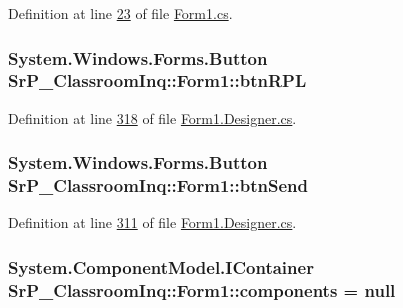 \-Definition at line \hyperlink{_form1_8cs_source_l00023}{23} of file \hyperlink{_form1_8cs_source}{\-Form1.\-cs}.

\hypertarget{class_sr_p___classroom_inq_1_1_form1_a92767c7c3fd6f7c6890a4aa3bd2efefa}{
\subsubsection[{btn\-R\-P\-L}]{\setlength{\rightskip}{0pt plus 5cm}\-System.\-Windows.\-Forms.\-Button {\bf \-Sr\-P\-\_\-\-Classroom\-Inq\-::\-Form1\-::btn\-R\-P\-L}}}
\label{class_sr_p___classroom_inq_1_1_form1_a92767c7c3fd6f7c6890a4aa3bd2efefa}


\-Definition at line \hyperlink{_form1_8_designer_8cs_source_l00318}{318} of file \hyperlink{_form1_8_designer_8cs_source}{\-Form1.\-Designer.\-cs}.

\hypertarget{class_sr_p___classroom_inq_1_1_form1_a1e5e8dfae30625b2a45b24a75a966514}{
\subsubsection[{btn\-Send}]{\setlength{\rightskip}{0pt plus 5cm}\-System.\-Windows.\-Forms.\-Button {\bf \-Sr\-P\-\_\-\-Classroom\-Inq\-::\-Form1\-::btn\-Send}}}
\label{class_sr_p___classroom_inq_1_1_form1_a1e5e8dfae30625b2a45b24a75a966514}


\-Definition at line \hyperlink{_form1_8_designer_8cs_source_l00311}{311} of file \hyperlink{_form1_8_designer_8cs_source}{\-Form1.\-Designer.\-cs}.

\hypertarget{class_sr_p___classroom_inq_1_1_form1_accb63125f3efaee7cf29bc694431d352}{
\subsubsection[{components}]{\setlength{\rightskip}{0pt plus 5cm}\-System.\-Component\-Model.\-I\-Container {\bf \-Sr\-P\-\_\-\-Classroom\-Inq\-::\-Form1\-::components} = null}}
\label{class_sr_p___classroom_inq_1_1_form1_accb63125f3efaee7cf29bc694431d352}


